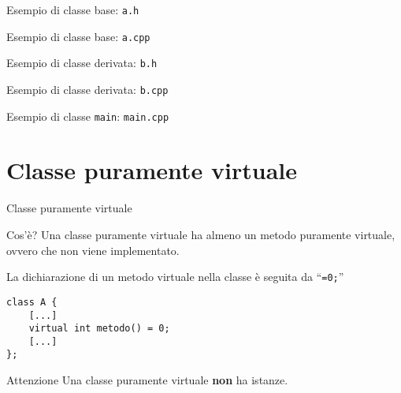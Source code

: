 \documentclass[xcolor={dvipsnames, svgnames, x11names, table}, 10pt]{beamer}
\begin{document}
\begin{frame}[t, fragile]{Esempio di \alert{classe base}: \texttt{a.h}}


\end{frame}

\begin{frame}[t, fragile]{Esempio di \alert{classe base}: \texttt{a.cpp}}


\end{frame}

\begin{frame}[t, fragile]{Esempio di \alert{classe derivata}: \texttt{b.h}}


\end{frame}

\begin{frame}[t, fragile]{Esempio di \alert{classe derivata}: \texttt{b.cpp}}


\end{frame}

\begin{frame}{Esempio di classe \alert{\texttt{main}}: \texttt{main.cpp}}
    
    
\end{frame}

\section{Classe puramente virtuale}

\begin{frame}[fragile]{Classe puramente virtuale}

\begin{block}{Cos'è?}
    Una classe puramente virtuale ha almeno un metodo puramente virtuale, ovvero che non viene implementato.
\end{block}

La dichiarazione di un metodo virtuale nella classe è seguita da \enquote{\texttt{=0;}}

\begin{verbatim}
class A {
    [...]
    virtual int metodo() = 0;
    [...]
};
\end{verbatim}
    
\begin{alertblock}{Attenzione}
Una classe puramente virtuale \textbf{non} ha istanze.
\end{alertblock}

\end{frame}
\end{document}
